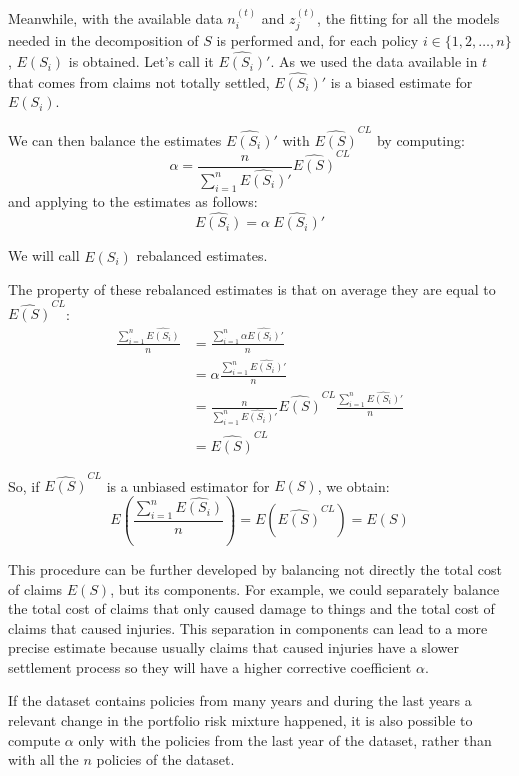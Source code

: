 \documentclass[a4paper, nobind]{templates/ociamthesis}
\theoremstyle{definition}
\theoremstyle{definition}
\theoremstyle{definition}
\theoremstyle{remark}
\begin{document}
Meanwhile, with the available data \(n_i^{(t)}\) and \(z_j^{(t)}\), the fitting for all the models needed in the decomposition of \(S\) is performed and, for each policy \(i\in\{1, 2, \dots, n\}\), \(E(S_i)\) is obtained. Let's call it \(\widehat{E(S_i)}'\). As we used the data available in \(t\) that comes from claims not totally settled, \(\widehat{E(S_i)}'\) is a biased estimate for \(E(S_i)\).

We can then balance the estimates \(\widehat{E(S_i)}'\) with \(\widehat{E(S)}^{CL}\) by computing:
\[
\alpha = \frac{n}{\sum_{i=1}^{n}{\widehat{E(S_i)}'}} \widehat{E(S)}^{CL}
\]
and applying to the estimates as follows:
\[
\widehat{E(S_i)} = \alpha \ \widehat{E(S_i)}'
\]

We will call \(\widehat{E(S_i)}\) rebalanced estimates.

The property of these rebalanced estimates is that on average they are equal to \(\widehat{E(S)}^{CL}\):
\begin{align*}
\frac{\sum_{i=1}^{n}{\widehat{E(S_i)}}}{n} & = \frac{\sum_{i=1}^{n}{\alpha\widehat{E(S_i)}'}}{n} \\
& = \alpha\frac{\sum_{i=1}^{n}{\widehat{E(S_i)}'}}{n} \\
& = \frac{n}{\sum_{i=1}^{n}{\widehat{E(S_i)}'}} \widehat{E(S)}^{CL} \frac{\sum_{i=1}^{n}{\widehat{E(S_i)}'}}{n} \\
& = \widehat{E(S)}^{CL}
\end{align*}

So, if \(\widehat{E(S)}^{CL}\) is a unbiased estimator for \(E(S)\), we obtain:
\[
E\left( \frac{\sum_{i=1}^{n}{\widehat{E(S_i)}}}{n} \right)
= E\left( \widehat{E(S)}^{CL} \right)
= E(S)
\]

This procedure can be further developed by balancing not directly the total cost of claims \(E(S)\), but its components. For example, we could separately balance the total cost of claims that only caused damage to things and the total cost of claims that caused injuries. This separation in components can lead to a more precise estimate because usually claims that caused injuries have a slower settlement process so they will have a higher corrective coefficient \(\alpha\).

If the dataset contains policies from many years and during the last years a relevant change in the portfolio risk mixture happened, it is also possible to compute \(\alpha\) only with the policies from the last year of the dataset, rather than with all the \(n\) policies of the dataset.
\end{document}
